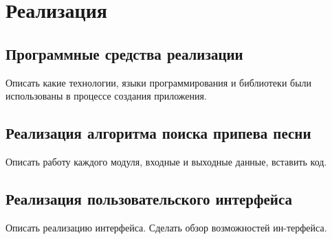 \lstset{language=C, frame=L, basicstyle=\footnotesize,%
	keywordstyle=\bfseries, showstringspaces=false, xleftmargin=\parindent, numbers=none, numberstyle=\tiny, stepnumber=2, numbersep=5pt}
\newpage
\section{Реализация}
\label{sec:Design}
\subsection{Программные средства реализации}
Описать какие технологии, языки программирования и библиотеки были использованы в процессе создания приложения.
\vspace{2em}
\subsection{Реализация алгоритма поиска припева песни}
Описать работу каждого модуля, входные и выходные данные, вставить код.
\vspace{2em}
\subsection{Реализация пользовательского интерфейса}
Описать реализацию интерфейса. Сделать обзор возможностей ин-терфейса.